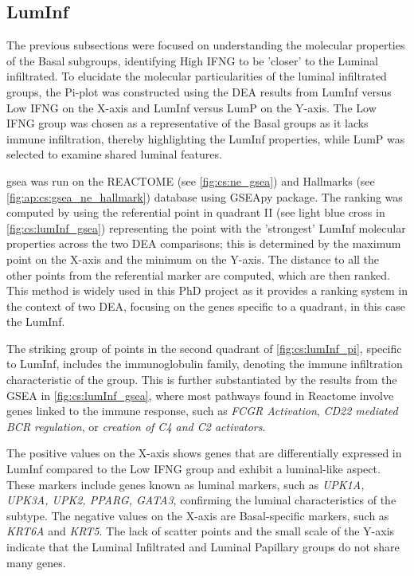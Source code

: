 \subsection{LumInf} \label{s:cs:lumInf_interp}

The previous subsections were focused on understanding the molecular properties of the Basal subgroups, identifying High IFNG to be 'closer' to the Luminal infiltrated. To elucidate the molecular particularities of the luminal infiltrated groups, the Pi-plot was constructed using the DEA results from LumInf versus Low IFNG on the X-axis and LumInf versus LumP on the Y-axis. The Low IFNG group was chosen as a representative of the Basal groups as it lacks immune infiltration, thereby highlighting the LumInf properties, while LumP was selected to examine shared luminal features.

\acrfull{gsea} was run on the REACTOME (see \cref{fig:cs:ne_gsea}) and Hallmarks (see \ref{fig:ap:cs:gsea_ne_hallmark}) database using GSEApy \citet{Fang2023-ec} package. The ranking was computed by using the referential point in quadrant II (see light blue cross in \cref{fig:cs:lumInf_gsea}) representing the point with the 'strongest' LumInf molecular properties across the two DEA comparisons; this is determined by the maximum point on the X-axis and the minimum on the Y-axis. The distance to all the other points from the referential marker are computed, which are then ranked. This method is widely used in this PhD project as it provides a ranking system in the context of two DEA, focusing on the genes specific to a quadrant, in this case the LumInf. 

The striking group of points in the second quadrant of \cref{fig:cs:lumInf_pi}, specific to LumInf, includes the immunoglobulin family, denoting the immune infiltration characteristic of the group. This is further substantiated by the results from the GSEA in \cref{fig:cs:lumInf_gsea}, where most pathways found in Reactome involve genes linked to the immune response, such as \textit{FCGR Activation}, \textit{CD22 mediated BCR regulation}, or \textit{creation of C4 and C2 activators}.


The positive values on the X-axis shows genes that are differentially expressed in LumInf compared to the Low IFNG group and exhibit a luminal-like aspect. These markers include genes known as luminal markers, such as \textit{UPK1A, UPK3A, UPK2, PPARG, GATA3}, confirming the luminal characteristics of the subtype. The negative values on the X-axis are Basal-specific markers, such as \textit{KRT6A} and \textit{KRT5}. The lack of scatter points and the small scale of the Y-axis indicate that the Luminal Infiltrated and Luminal Papillary groups do not share many genes.

